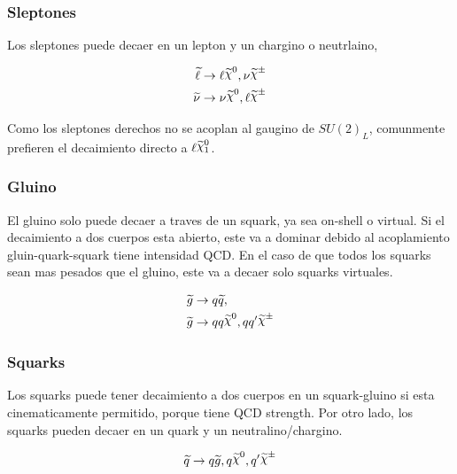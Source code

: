 \subsubsection{Sleptones}

Los sleptones puede decaer en un lepton y un chargino o neutrlaino,

\begin{align}
  \slepton &\to \ell \nino, \nu\chinopm \\
  \snu &\to \nu\nino, \ell\chinopm
\end{align}

Como los sleptones derechos no se acoplan al gaugino de $SU(2)_L$,
comunmente prefieren el decaimiento directo a $\ell\ninoone$.

\subsubsection{Gluino}

El gluino solo puede decaer a traves de un squark, ya sea on-shell o
virtual. Si el decaimiento a dos cuerpos esta abierto, este va a
dominar debido al acoplamiento gluin-quark-squark tiene intensidad QCD.
En el caso de que todos los squarks sean mas pesados que el gluino,
este va a decaer solo squarks virtuales.

\begin{align}
  &\gluino \to q\susy{q}, \\
  &\gluino \to qq\nino, qq^\prime \chinopm
\end{align}


\subsubsection{Squarks}

Los squarks puede tener decaimiento a dos cuerpos en un squark-gluino
si esta cinematicamente permitido, porque tiene QCD strength. Por otro
lado, los squarks pueden decaer en un quark y un neutralino/chargino.

\begin{equation}
  \susy{q} \to q\gluino, q\nino, q^\prime \chinopm
\end{equation}



